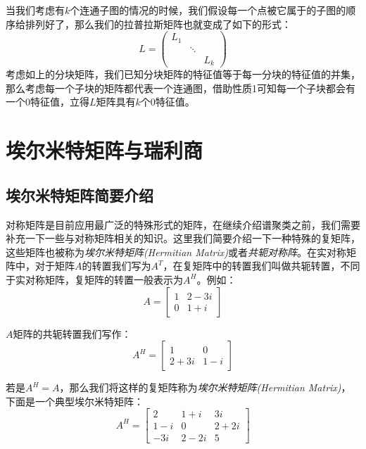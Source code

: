 \documentclass[UTF8, 12pt]{ctexart}
\begin{document}
当我们考虑有$k$个连通子图的情况的时候，我们假设每一个点被它属于的子图的顺序给排列好了，那么我们的拉普拉斯矩阵也就变成了如下的形式：
\begin{equation}
	L = 
	\begin{pmatrix}
	L_1 &  &  \\
	& \ddots & \\
	& & L_k
	\end{pmatrix}
\end{equation}
考虑如上的分块矩阵，我们已知分块矩阵的特征值等于每一分块的特征值的并集，那么考虑每一个子块的矩阵都代表一个连通图，借助性质1可知每一个子块都会有一个0特征值，立得$L$矩阵具有$k$个0特征值。

\section{埃尔米特矩阵与瑞利商}
\subsection{埃尔米特矩阵简要介绍}
对称矩阵是目前应用最广泛的特殊形式的矩阵，在继续介绍谱聚类之前，我们需要补充一下一些与对称矩阵相关的知识。这里我们简要介绍一下一种特殊的复矩阵，这些矩阵也被称为\emph{埃尔米特矩阵(Hermitian Matrix)}或者\emph{共轭对称阵}。在实对称矩阵中，对于矩阵$A$的转置我们写为$A^T$，在复矩阵中的转置我们叫做共轭转置，不同于实对称矩阵，复矩阵的转置一般表示为$A^{H}$。例如：
\begin{equation}
A = \begin{bmatrix}
1 & 2-3i \\
0 & 1+i
\end{bmatrix}
\end{equation}

$A$矩阵的共轭转置我们写作：
\begin{equation}
A^H = \begin{bmatrix}
1 & 0 \\
2+3i & 1-i
\end{bmatrix}
\end{equation}

若是$A^{H} = A$，那么我们将这样的复矩阵称为\emph{埃尔米特矩阵(Hermitian Matrix)}，下面是一个典型埃尔米特矩阵：
\begin{equation}
A^H = \begin{bmatrix}
2 & 1+i & 3i \\
1-i & 0 & 2+2i \\
-3i & 2-2i & 5
\end{bmatrix}
\end{equation}
\end{document}

